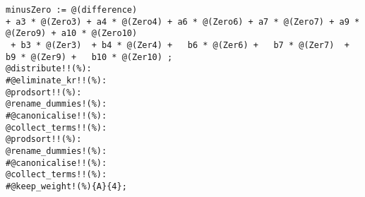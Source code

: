 \documentclass[11pt]{article}
\begin{document}
{\color[named]{Blue}\begin{verbatim}
minusZero := @(difference) 
+ a3 * @(Zero3) + a4 * @(Zero4) + a6 * @(Zero6) + a7 * @(Zero7) + a9 * @(Zero9) + a10 * @(Zero10) 
 + b3 * @(Zer3)  + b4 * @(Zer4) +   b6 * @(Zer6) +   b7 * @(Zer7)  +  b9 * @(Zer9) +   b10 * @(Zer10) ;
@distribute!!(%):
#@eliminate_kr!!(%):
@prodsort!!(%):
@rename_dummies!(%):
#@canonicalise!!(%):
@collect_terms!!(%):
@prodsort!!(%):
@rename_dummies!(%):
#@canonicalise!!(%):
@collect_terms!!(%):
#@keep_weight!(%){A}{4};
\end{verbatim}}
\end{document}
